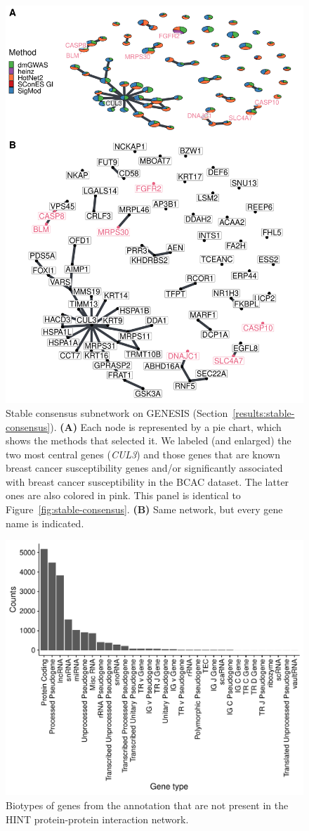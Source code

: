 \documentclass[10pt,letterpaper]{article}
\begin{document}
\begin{figure}[htbp]
  \centering
  \includegraphics[width=.675\linewidth]{./figures/sfigure_6.pdf}
  \caption{Stable consensus subnetwork on GENESIS (Section~\ref{results:stable-consensus}). \textbf{(A)} Each node is represented by a pie chart, which shows the methods that selected it. We labeled (and enlarged) the two most central genes (\emph{CUL3}) and those genes that are known breast cancer susceptibility genes and/or significantly associated with breast cancer susceptibility in the BCAC dataset. The latter ones are also colored in pink. This panel is identical to Figure~\ref{fig:stable-consensus}. \textbf{(B)} Same network, but every gene name is indicated.}
  \label{sfig:stable-consensus-names}
\end{figure}

\begin{figure}[htbp]
\centering
\includegraphics[width=.9\linewidth]{./figures/sfigure_7.pdf}
\caption{Biotypes of genes from the annotation that are not present in the HINT protein-protein interaction network.}
\label{sfig:biotypes_excluded}
\end{figure}
\end{document}
